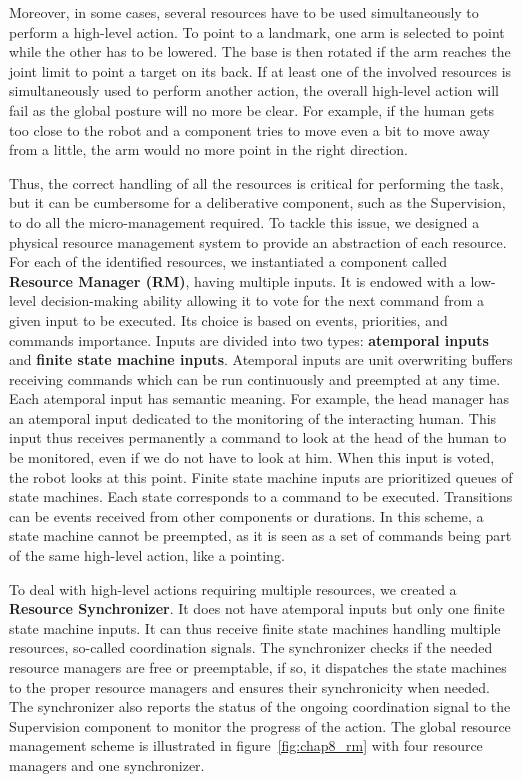 Moreover, in some cases, several resources have to be used simultaneously to perform a high-level action. To point to a landmark, one arm is selected to point while the other has to be lowered. The base is then rotated if the arm reaches the joint limit to point a target on its back. If at least one of the involved resources is simultaneously used to perform another action, the overall high-level action will fail as the global posture will no more be clear. For example, if the human gets too close to the robot and a component tries to move even a bit to move away from a little, the arm would no more point in the right direction.

Thus, the correct handling of all the resources is critical for performing the task, but it can be cumbersome for a deliberative component, such as the Supervision, to do all the micro-management required. To tackle this issue, we designed a physical resource management system to provide an abstraction of each resource. For each of the identified resources, we instantiated a component called \textbf{Resource Manager (RM)}, having multiple inputs. It is endowed with a low-level decision-making ability allowing it to vote for the next command from a given input to be executed. Its choice is based on events, priorities, and commands importance. Inputs are divided into two types: \textbf{atemporal inputs} and \textbf{finite state machine inputs}. Atemporal inputs are unit overwriting buffers receiving commands which can be run continuously and preempted at any time. Each atemporal input has semantic meaning. For example, the head manager has an atemporal input dedicated to the monitoring of the interacting human. This input thus receives permanently a command to look at the head of the human to be monitored, even if we do not have to look at him. When this input is voted, the robot looks at this point. Finite state machine inputs are prioritized queues of state machines. Each state corresponds to a command to be executed. Transitions can be events received from other components or durations. In this scheme, a state machine cannot be preempted, as it is seen as a set of commands being part of the same high-level action, like a pointing.

To deal with high-level actions requiring multiple resources, we created a \textbf{Resource Synchronizer}. It does not have atemporal inputs but only one finite state machine inputs. It can thus receive finite state machines handling multiple resources, so-called coordination signals. The synchronizer checks if the needed resource managers are free or preemptable, if so, it dispatches the state machines to the proper resource managers and ensures their synchronicity when needed. The synchronizer also reports the status of the ongoing coordination signal to the Supervision component to monitor the progress of the action.
The global resource management scheme is illustrated in figure~\ref{fig:chap8_rm} with four resource managers and one synchronizer.

